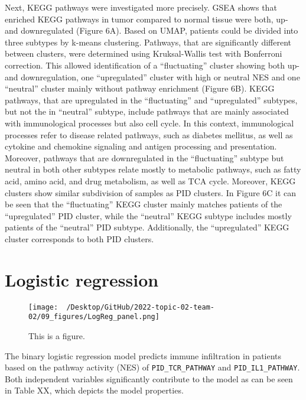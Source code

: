 \documentclass[
  parskip,
  oneside]{scrreprt}
\begin{document}
Next, KEGG pathways were investigated more precisely. GSEA shows that
enriched KEGG pathways in tumor compared to normal tissue were both, up-
and downregulated (Figure 6A). Based on UMAP, patients could be divided
into three subtypes by k-means clustering. Pathways, that are
significantly different between clusters, were determined using
Kruksal-Wallis test with Bonferroni correction. This allowed
identification of a ``fluctuating'' cluster showing both up- and
downregulation, one ``upregulated'' cluster with high or neutral NES and
one ``neutral'' cluster mainly without pathway enrichment (Figure 6B).
KEGG pathways, that are upregulated in the ``fluctuating'' and
``upregulated'' subtypes, but not the in ``neutral'' subtype, include
pathways that are mainly associated with immunological processes but
also cell cycle. In this context, immunological processes refer to
disease related pathways, such as diabetes mellitus, as well as cytokine
and chemokine signaling and antigen processing and presentation.\\
Moreover, pathways that are downregulated in the ``fluctuating'' subtype
but neutral in both other subtypes relate mostly to metabolic pathways,
such as fatty acid, amino acid, and drug metabolism, as well as TCA
cycle. Moreover, KEGG clusters show similar subdivision of samples as
PID clusters. In Figure 6C it can be seen that the ``fluctuating'' KEGG
cluster mainly matches patients of the ``upregulated'' PID cluster,
while the ``neutral'' KEGG subtype includes mostly patients of the
``neutral'' PID subtype. Additionally, the ``upregulated'' KEGG cluster
corresponds to both PID clusters.

\hypertarget{logistic-regression}{%
\section{Logistic regression}\label{logistic-regression}}

\begin{figure}
  \texttt{[image: ~/Desktop/GitHub/2022-topic-02-team-02/09\_figures/LogReg\_panel.png]}
  \caption{This is a figure.}
\end{figure}

The binary logistic regression model predicts immune infiltration in
patients based on the pathway activity (NES) of
\texttt{PID\_TCR\_PATHWAY} and \texttt{PID\_IL1\_PATHWAY}. Both
independent variables significantly contribute to the model as can be
seen in Table XX, which depicts the model properties.
\end{document}
